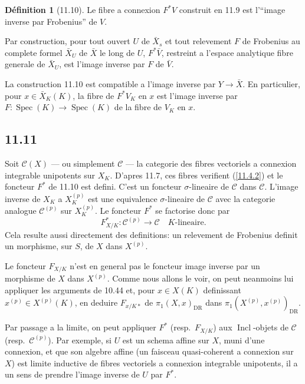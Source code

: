\documentclass[12pt,a4paper]{article}
\theoremstyle{plain}
\theoremstyle{definition}
\newtheorem{definition}[theorem]{D\'efinition}
\theoremstyle{remark}
\DeclareMathOperator{\Spec}{Spec}
\DeclareMathOperator{\Incl}{Incl}
\newcommand{\DR}{\mathrm{DR}}
\begin{document}
\begin{definition}[11.10]
Le fibre a connexion $F^* V$ construit en 11.9 est l'``image inverse par Frobenius'' de $V$.
\end{definition}

Par construction, pour tout ouvert $U$ de $\bar{X}_s$ et tout relevement $F$ de Frobenius au complete formel $\bar{X}_U$ de $\bar{X}$ le long de $U$, $F^* \bar{V}$, restreint a l'espace analytique fibre generale de $\bar{X}_U$, est l'image inverse par $F$ de $\bar{V}$.

La construction 11.10 est compatible a l'image inverse par $Y \to \bar{X}$. En particulier, pour $x \in \bar{X}_K(K)$, la fibre de $F^* V_K$ en $x$ est l'image inverse par $F: \Spec(K) \to \Spec(K)$ de la fibre de $V_K$ en $x$.

\subsection*{11.11}

Soit $\mathcal{C}(X)$ --- ou simplement $\mathcal{C}$ --- la categorie des fibres vectoriels a connexion integrable unipotents sur $X_K$. D'apres 11.7, ces fibres verifient (\ref{11.4.2}) et le foncteur $F^*$ de 11.10 est defini. C'est un foncteur $\sigma$-lineaire de $\mathcal{C}$ dans $\mathcal{C}$. L'image inverse de $X_K$ a $X_K^{(p)}$ est une equivalence $\sigma$-lineaire de $\mathcal{C}$ avec la categorie analogue $\mathcal{C}^{(p)}$ sur $X_K^{(p)}$. Le foncteur $F^*$ se factorise donc par
\begin{equation}\label{11.11.1}
F_{X/K}^*: \mathcal{C}^{(p)} \longrightarrow \mathcal{C} \quad \text{$K$-lineaire.} \tag{11.11.1}
\end{equation}
Cela resulte aussi directement des definitions: un relevement de Frobenius definit un morphisme, sur $S$, de $X$ dans $X^{(p)}$.

Le foncteur $F_{X/K}$ n'est en general pas le foncteur image inverse par un morphisme de $X$ dans $X^{(p)}$. Comme nous allons le voir, on peut neanmoins lui appliquer les arguments de 10.44 et, pour $x \in X(K)$ definissant $x^{(p)} \in X^{(p)}(K)$, en deduire $F_{x/K *}$ de $\pi_1(X, x)_{\DR}$ dans $\pi_1(X^{(p)}, x^{(p)})_{\DR}$.

Par passage a la limite, on peut appliquer $F^*$ (resp.~$F_{X/K}$) aux $\Incl$-objets de $\mathcal{C}$ (resp.~$\mathcal{C}^{(p)}$). Par exemple, si $U$ est un schema affine sur $X$, muni d'une connexion, et que son algebre affine (un faisceau quasi-coherent a connexion sur $X$) est limite inductive de fibres vectoriels a connexion integrable unipotents, il a un sens de prendre l'image inverse de $U$ par $F^*$.
\end{document}
